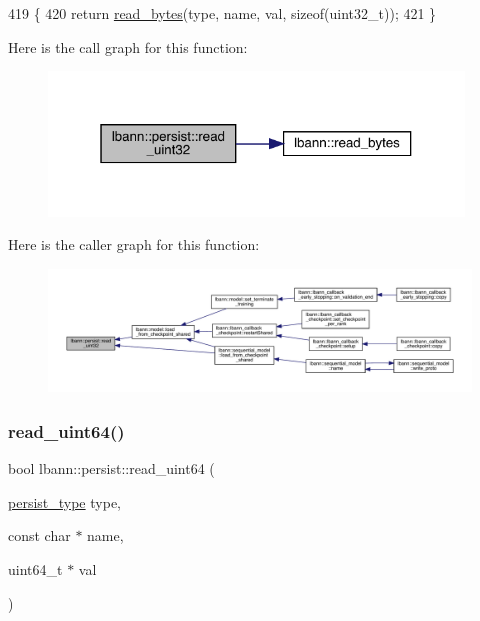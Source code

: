 \begin{DoxyCode}
419                                                                                  \{
420   \textcolor{keywordflow}{return} \hyperlink{classlbann_1_1persist_af24f635f634c8cf30cf53a0e90ec641b}{read\_bytes}(type, name, val, \textcolor{keyword}{sizeof}(uint32\_t));
421 \}
\end{DoxyCode}
Here is the call graph for this function\+:\nopagebreak
\begin{figure}[H]
\begin{center}
\leavevmode
\includegraphics[width=313pt]{classlbann_1_1persist_ace1ebb58e2570693cdce0ebd2817113b_cgraph}
\end{center}
\end{figure}
Here is the caller graph for this function\+:\nopagebreak
\begin{figure}[H]
\begin{center}
\leavevmode
\includegraphics[width=350pt]{classlbann_1_1persist_ace1ebb58e2570693cdce0ebd2817113b_icgraph}
\end{center}
\end{figure}
\mbox{\label{classlbann_1_1persist_aa6d996db3714a7ae055adac0d8e8ac63}} 
\subsubsection{\texorpdfstring{read\+\_\+uint64()}{read\_uint64()}}
{\footnotesize\ttfamily bool lbann\+::persist\+::read\+\_\+uint64 (\begin{DoxyParamCaption}\item[{\hyperlink{namespacelbann_adee41f31f15f3906cbdcce4a1417eb56}{persist\+\_\+type}}]{type,  }\item[{const char $\ast$}]{name,  }\item[{uint64\+\_\+t $\ast$}]{val }\end{DoxyParamCaption})}



